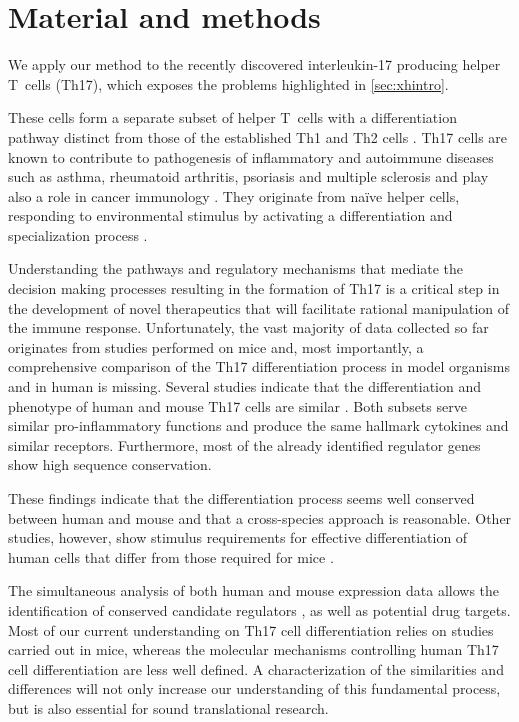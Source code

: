 \section{Material and methods}
\label{sec:xexp}

We apply our method to the recently discovered interleukin-17 producing helper T~cells (Th17), which exposes the problems highlighted in \cref{sec:xhintro}.

These cells form a separate subset of helper T~cells with a differentiation pathway distinct from those of the established Th1 and Th2 cells \parencite{park2005distinct}.
Th17 cells are known to contribute to pathogenesis of inflammatory and autoimmune diseases such as
asthma, rheumatoid arthritis, psoriasis and multiple sclerosis and play also a role in cancer immunology \parencite{wilke2011deciphering}.
They originate from na\"ive helper cells, responding to environmental stimulus by activating a differentiation and specialization process \parencite{steinman2007brief}.

Understanding the pathways and regulatory mechanisms that mediate the decision making processes resulting in the formation of Th17 is a critical step in the development of novel therapeutics that will facilitate rational manipulation of the immune response.
Unfortunately, the vast majority of data collected so far originates from studies performed on mice \parencite{tuomela2012identification} and, most importantly, a comprehensive comparison of the Th17 differentiation process in model organisms and in human is missing.
Several studies indicate that the differentiation and phenotype of human and mouse Th17 cells are similar \parencite{annunziato2009studies}.
Both subsets serve similar pro-inflammatory functions and produce the same hallmark cytokines and similar receptors.
Furthermore, most of the already identified regulator genes show high sequence conservation.

These findings indicate that the differentiation process seems well conserved between human and mouse and that a cross-species approach is reasonable.
Other studies, however, show stimulus requirements for effective differentiation of human cells that differ from those required for mice \parencites{mcgeachy2008th17}{o2008differentiation}{annunziato2009human}.

The simultaneous analysis of both human and mouse expression data allows the identification of conserved candidate regulators%
, as well as potential drug targets.
Most of our current understanding on Th17 cell differentiation relies on studies carried out in mice, whereas the molecular mechanisms controlling human Th17 cell differentiation are less well defined.
A characterization of the similarities and differences will not only increase our understanding of this fundamental process, but is also essential for sound translational research.

